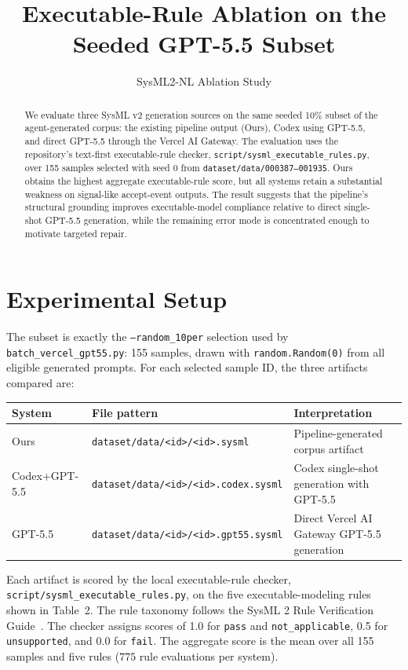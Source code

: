 \documentclass[11pt]{article}
\title{Executable-Rule Ablation on the Seeded GPT-5.5 Subset}
\author{SysML2-NL Ablation Study}
\date{}
\newcommand{\code}[1]{\texttt{\small #1}}
\newcommand{\sysml}{SysML v2}
\begin{document}
\maketitle

\begin{abstract}
We evaluate three \sysml{} generation sources on the same seeded 10\% subset
of the agent-generated corpus: the existing pipeline output (Ours),
Codex using GPT-5.5, and direct GPT-5.5 through the Vercel AI Gateway. The
evaluation uses the repository's text-first executable-rule checker,
\code{script/sysml\_executable\_rules.py}, over 155 samples selected with
seed 0 from \code{dataset/data/000387--001935}. Ours obtains the highest
aggregate executable-rule score, but all systems retain a substantial weakness
on signal-like accept-event outputs. The result suggests that the pipeline's
structural grounding improves executable-model compliance relative to direct
single-shot GPT-5.5 generation, while the remaining error mode is concentrated
enough to motivate targeted repair.
\end{abstract}

\section{Experimental Setup}

The subset is exactly the \code{--random\_10per} selection used by
\code{batch\_vercel\_gpt55.py}: 155 samples, drawn with \code{random.Random(0)}
from all eligible generated prompts. For each selected sample ID, the three
artifacts compared are:

\begin{center}
\small
\begin{tabularx}{\linewidth}{l>{\raggedright\arraybackslash}X>{\raggedright\arraybackslash}X}
\toprule
System & File pattern & Interpretation \\
\midrule
Ours & \code{dataset/data/<id>/<id>.sysml} &
Pipeline-generated corpus artifact \\
Codex+GPT-5.5 & \code{dataset/data/<id>/<id>.codex.sysml} &
Codex single-shot generation with GPT-5.5 \\
GPT-5.5 & \code{dataset/data/<id>/<id>.gpt55.sysml} &
Direct Vercel AI Gateway GPT-5.5 generation \\
\bottomrule
\end{tabularx}
\end{center}

Each artifact is scored by the local executable-rule checker,
\code{script/sysml\_executable\_rules.py}, on the five executable-modeling
rules shown in Table~2. The rule taxonomy follows the SysML 2 Rule
Verification Guide~\cite{sysml2RuleVerificationGuide}. The checker assigns
scores of 1.0 for \code{pass} and
\code{not\_applicable}, 0.5 for \code{unsupported}, and 0.0 for
\code{fail}. The aggregate score is the mean over all 155 samples and five
rules (\(775\) rule evaluations per system).
\end{document}
